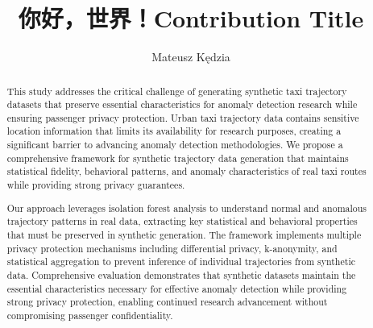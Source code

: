 \documentclass[runningheads]{llncs}
\newcommand{\zh}[1]{{\chinesefont #1}}
\begin{document}

\title{ \zh{你好，世界！}Contribution Title}
%
%
\author{Mateusz Kędzia}
%
\authorrunning{ \zh{你好，世界！} Author et al.}
%
%
\maketitle      %
%
\begin{abstract}
This study addresses the critical challenge of generating synthetic taxi trajectory datasets that preserve essential characteristics for anomaly detection research while ensuring passenger privacy protection. Urban taxi trajectory data contains sensitive location information that limits its availability for research purposes, creating a significant barrier to advancing anomaly detection methodologies. We propose a comprehensive framework for synthetic trajectory data generation that maintains statistical fidelity, behavioral patterns, and anomaly characteristics of real taxi routes while providing strong privacy guarantees.

Our approach leverages isolation forest analysis to understand normal and anomalous trajectory patterns in real data, extracting key statistical and behavioral properties that must be preserved in synthetic generation. The framework implements multiple privacy protection mechanisms including differential privacy, k-anonymity, and statistical aggregation to prevent inference of individual trajectories from synthetic data. Comprehensive evaluation demonstrates that synthetic datasets maintain the essential characteristics necessary for effective anomaly detection while providing strong privacy protection, enabling continued research advancement without compromising passenger confidentiality.

\end{abstract}
%
%
\newpage
\end{document}
